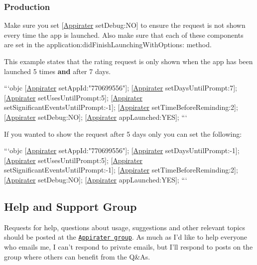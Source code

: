 \subsubsection*{Production}

Make sure you set {\ttfamily \mbox{[}\hyperlink{interface_appirater}{Appirater} set\-Debug\-:N\-O\mbox{]}} to ensure the request is not shown every time the app is launched. Also make sure that each of these components are set in the {\ttfamily application\-:did\-Finish\-Launching\-With\-Options\-:} method.

This example states that the rating request is only shown when the app has been launched 5 times {\bfseries and} after 7 days.

```objc \mbox{[}\hyperlink{interface_appirater}{Appirater} set\-App\-Id\-:"770699556"\mbox{]}; \mbox{[}\hyperlink{interface_appirater}{Appirater} set\-Days\-Until\-Prompt\-:7\mbox{]}; \mbox{[}\hyperlink{interface_appirater}{Appirater} set\-Uses\-Until\-Prompt\-:5\mbox{]}; \mbox{[}\hyperlink{interface_appirater}{Appirater} set\-Significant\-Events\-Until\-Prompt\-:-\/1\mbox{]}; \mbox{[}\hyperlink{interface_appirater}{Appirater} set\-Time\-Before\-Reminding\-:2\mbox{]}; \mbox{[}\hyperlink{interface_appirater}{Appirater} set\-Debug\-:N\-O\mbox{]}; \mbox{[}\hyperlink{interface_appirater}{Appirater} app\-Launched\-:Y\-E\-S\mbox{]}; ```

If you wanted to show the request after 5 days only you can set the following\-:

```objc \mbox{[}\hyperlink{interface_appirater}{Appirater} set\-App\-Id\-:"770699556"\mbox{]}; \mbox{[}\hyperlink{interface_appirater}{Appirater} set\-Days\-Until\-Prompt\-:-\/1\mbox{]}; \mbox{[}\hyperlink{interface_appirater}{Appirater} set\-Uses\-Until\-Prompt\-:5\mbox{]}; \mbox{[}\hyperlink{interface_appirater}{Appirater} set\-Significant\-Events\-Until\-Prompt\-:-\/1\mbox{]}; \mbox{[}\hyperlink{interface_appirater}{Appirater} set\-Time\-Before\-Reminding\-:2\mbox{]}; \mbox{[}\hyperlink{interface_appirater}{Appirater} set\-Debug\-:N\-O\mbox{]}; \mbox{[}\hyperlink{interface_appirater}{Appirater} app\-Launched\-:Y\-E\-S\mbox{]}; ```

\subsection*{Help and Support Group }

Requests for help, questions about usage, suggestions and other relevant topics should be posted at the \href{http://groups.google.com/group/appirater}{\tt Appirater group}. As much as I'd like to help everyone who emails me, I can't respond to private emails, but I'll respond to posts on the group where others can benefit from the Q\&As.

